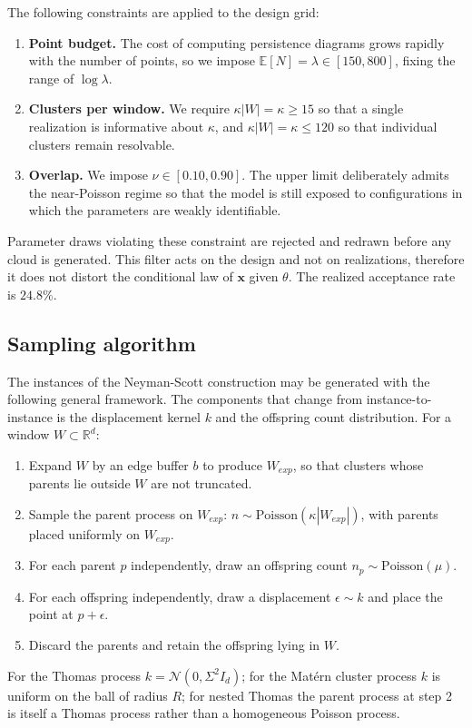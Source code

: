 \documentclass[11pt,letterpaper]{article}
\newcommand{\R}{\mathbb{R}}
\newcommand{\1}{\mathds{1}}
\newcommand{\pc}{\mathbf{x}}
\newcommand{\simpcom}{\Sigma}
\theoremstyle{plain}
\theoremstyle{definitioncolon}
\begin{document}
The following constraints are applied to the design grid:
    \begin{enumerate}
        \item \textbf{Point budget.} The cost of computing persistence diagrams
        grows rapidly with the number of points, so we impose
        $\mathbb{E}[N] = \lambda \in [150, 800]$, fixing the range of
        $\log\lambda$.
        \item \textbf{Clusters per window.} We require $\kappa|W| = \kappa \geq 15$
        so that a single realization is informative about $\kappa$, and
        $\kappa|W| = \kappa \leq 120$ so that individual clusters remain
        resolvable.
        \item \textbf{Overlap.} We impose $\nu \in [0.10, 0.90]$. The upper
        limit deliberately admits the near-Poisson regime so that the model is
        still exposed to configurations in which the parameters are weakly
        identifiable.
    \end{enumerate}
Parameter draws violating these constraint are rejected and redrawn before any
cloud is generated. This filter acts on the design and not on realizations,
therefore it does not distort the conditional law of $\pc$ given $\theta$. The
realized acceptance rate is $24.8\%$.

\subsection{Sampling algorithm}
\label{ssec:sampling}

The instances of the Neyman-Scott construction may be generated with the following
general framework. The components that change from instance-to-instance is the
displacement kernel $k$ and the offspring count distribution. For a window
$W \subset \R^d$:
    \begin{enumerate}
        \item Expand $W$ by an edge buffer $b$ to produce $W_{exp}$, so that
        clusters whose parents lie outside $W$ are not truncated.
        \item Sample the parent process on $W_{exp}$:
        $n \sim \mathrm{Poisson}(\kappa|W_{exp}|)$, with parents placed uniformly
        on $W_{exp}$.
        \item For each parent $p$ independently, draw an offspring count
        $n_p \sim \mathrm{Poisson}(\mu)$.
        \item For each offspring independently, draw a displacement
        $\epsilon \sim k$ and place the point at $p + \epsilon$.
        \item Discard the parents and retain the offspring lying in $W$.
    \end{enumerate}
For the Thomas process $k = \mathcal{N}(0, \simpcom^2 I_d)$; for the Mat\'ern
cluster process $k$ is uniform on the ball of radius $R$; for nested Thomas the
parent process at step 2 is itself a Thomas process rather than a homogeneous
Poisson process.
\end{document}
